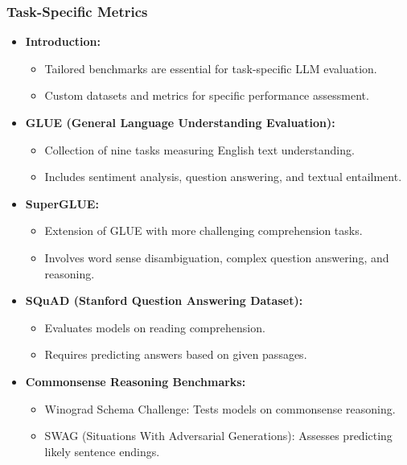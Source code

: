 \begin{frame}[fragile]\frametitle{Task-Specific Metrics}
  \begin{itemize}
    \item \textbf{Introduction:}
      \begin{itemize}
        \item Tailored benchmarks are essential for task-specific LLM evaluation.
        \item Custom datasets and metrics for specific performance assessment.
      \end{itemize}
    \item \textbf{GLUE (General Language Understanding Evaluation):}
      \begin{itemize}
        \item Collection of nine tasks measuring English text understanding.
        \item Includes sentiment analysis, question answering, and textual entailment.
      \end{itemize}
    \item \textbf{SuperGLUE:}
      \begin{itemize}
        \item Extension of GLUE with more challenging comprehension tasks.
        \item Involves word sense disambiguation, complex question answering, and reasoning.
      \end{itemize}
    \item \textbf{SQuAD (Stanford Question Answering Dataset):}
      \begin{itemize}
        \item Evaluates models on reading comprehension.
        \item Requires predicting answers based on given passages.
      \end{itemize}
    \item \textbf{Commonsense Reasoning Benchmarks:}
      \begin{itemize}
        \item Winograd Schema Challenge: Tests models on commonsense reasoning.
        \item SWAG (Situations With Adversarial Generations): Assesses predicting likely sentence endings.
      \end{itemize}
  \end{itemize}
\end{frame}

